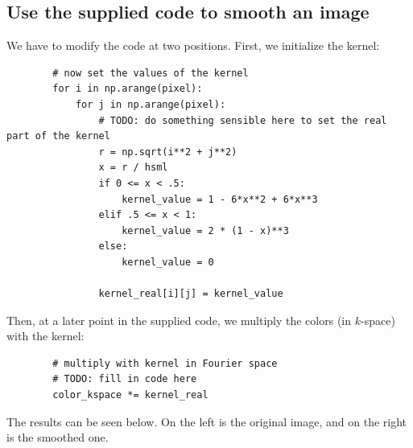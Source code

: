 \subsection{Use the supplied code to smooth an image}
    We have to modify the code at two positions.
    First, we initialize the kernel:
    \begin{lstlisting}
        # now set the values of the kernel
        for i in np.arange(pixel):
            for j in np.arange(pixel):
                # TODO: do something sensible here to set the real part of the kernel
                r = np.sqrt(i**2 + j**2)
                x = r / hsml
                if 0 <= x < .5:
                    kernel_value = 1 - 6*x**2 + 6*x**3
                elif .5 <= x < 1:
                    kernel_value = 2 * (1 - x)**3
                else:
                    kernel_value = 0
        
                kernel_real[i][j] = kernel_value\end{lstlisting}
    \newpage \noindent
    Then, at a later point in the supplied code, 
    we multiply the colors (in $k$-space) with the kernel:
    \begin{lstlisting}
        # multiply with kernel in Fourier space
        # TODO: fill in code here
        color_kspace *= kernel_real\end{lstlisting}
    The results can be seen below. On the left is the original image, 
    and on the right is the smoothed one.
